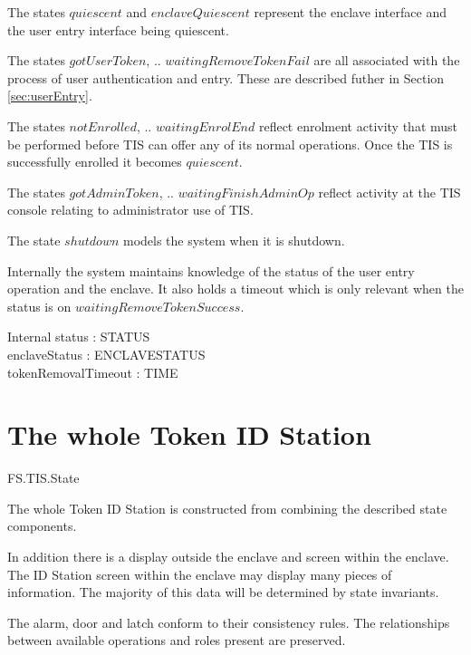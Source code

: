 The states $quiescent$ and $enclaveQuiescent$ represent the enclave
interface and the user entry interface being quiescent.

The states $gotUserToken$, .. 
$waitingRemoveTokenFail$ are all associated with the process of user
authentication and entry. These are described futher in Section \ref{sec:userEntry}.

The states $notEnrolled$, .. $waitingEnrolEnd$ reflect
enrolment activity that must be performed before TIS can offer any of
its normal operations. Once the TIS is successfully enrolled it
becomes $quiescent$.

The states $gotAdminToken$, .. $waitingFinishAdminOp$ 
reflect activity at the TIS console relating to administrator use of TIS. 

The state $shutdown$ models the system when it is shutdown.

Internally the system maintains knowledge of the status of the user
entry operation and the enclave. It also holds a timeout which is only
relevant when the status is on $waitingRemoveTokenSuccess$.

\begin{schema}{Internal}
        status : STATUS
\\      enclaveStatus : ENCLAVESTATUS
\\      tokenRemovalTimeout : TIME
\end{schema}

\section{The whole Token ID Station}

\begin{traceunit}{FS.TIS.State}
\end{traceunit}


The whole Token ID Station is constructed from combining the described
state components. 

In addition there is a display outside the enclave and screen
within the enclave. The ID Station screen within the enclave may
display many pieces of 
information. The majority of this data will be determined by state invariants.

The alarm, door and latch conform to their consistency rules.
The relationships between available operations and roles present are
preserved. 

